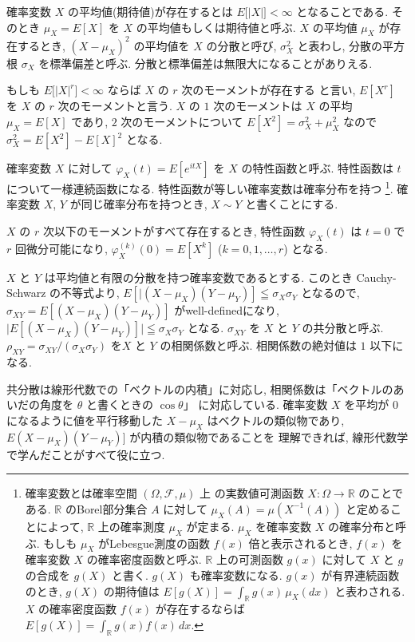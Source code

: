\documentclass[12pt,twoside]{jarticle}
\newcommand\R{{\mathbb R}} %
\theoremstyle{jplain}
\theoremstyle{jplain}
\theoremstyle{jplain}
\numberwithin{theorem}{section}
\numberwithin{equation}{section}
\numberwithin{figure}{section}
\numberwithin{table}{section}
\begin{document}
確率変数 $X$ の平均値(期待値)が存在するとは $E\bigl[|X|\bigr]<\infty$ となることである. 
そのとき $\mu_X=E[X]$ を $X$ の平均値もしくは期待値と呼ぶ.
$X$ の平均値 $\mu_X$ が存在するとき,  
$(X-\mu_X)^2$ の平均値を $X$ の分散と呼び, 
$\sigma_X^2$ と表わし, 分散の平方根 $\sigma_X$ を標準偏差と呼ぶ.
分散と標準偏差は無限大になることがありえる.

もしも $E\bigl[|X|^r\bigr]<\infty$ ならば $X$ の $r$ 次のモーメントが存在する
と言い, $E[X^r]$ を $X$ の $r$ 次のモーメントと言う.
$X$ の $1$ 次のモーメントは $X$ の平均 $\mu_X=E[X]$ であり, 
$2$ 次のモーメントについて $E[X^2]=\sigma_X^2+\mu_X^2$ 
なので $\sigma_X^2=E[X^2]-E[X]^2$ となる.

確率変数 $X$ に対して $\varphi_X(t)=E[e^{itX}]$ を $X$ の特性函数と呼ぶ.
特性函数は $t$ について一様連続函数になる.
特性函数が等しい確率変数は確率分布を持つ%
\footnote{確率変数とは確率空間 $(\Omega,\mathcal{F},\mu)$ 上
の実数値可測函数 $X:\Omega\to\R$ のことである. 
$\R$ のBorel部分集合 $A$ に対して $\mu_X(A)=\mu(X^{-1}(A))$ と定めることによって, 
$\R$ 上の確率測度 $\mu_X$ が定まる. $\mu_X$ を確率変数 $X$ の確率分布と呼ぶ.
もしも $\mu_X$ がLebesgue測度の函数 $f(x)$ 倍と表示されるとき, 
$f(x)$ を確率変数 $X$ の確率密度函数と呼ぶ.
$\R$ 上の可測函数 $g(x)$ に対して $X$ と $g$ の合成を $g(X)$ と書く.
$g(X)$ も確率変数になる. 
$g(x)$ が有界連続函数のとき, 
$g(X)$ の期待値は $E[g(X)]=\int_\R g(x)\,\mu_X(dx)$ と表わされる. 
$X$ の確率密度函数 $f(x)$ が存在するならば $E[g(X)]=\int_\R g(x)f(x)\,dx$.
}.
確率変数 $X$, $Y$ が同じ確率分布を持つとき, $X\sim Y$ と書くことにする.

$X$ の $r$ 次以下のモーメントがすべて存在するとき, 
特性函数 $\varphi_X(t)$ は $t=0$ で $r$ 回微分可能になり, 
$\varphi_X^{(k)}(0)=E[X^k]$ ($k=0,1,\ldots,r$) となる.

$X$ と $Y$ は平均値と有限の分散を持つ確率変数であるとする.
このとき Cauchy-Schwarz の不等式より, 
$E[|(X-\mu_X)(Y-\mu_Y)]\leqq\sigma_X\sigma_Y$ となるので, 
$\sigma_{XY}=E[(X-\mu_X)(Y-\mu_Y)]$ がwell-definedになり, 
$\bigl|E[(X-\mu_X)(Y-\mu_Y)]\bigr|\leqq\sigma_X\sigma_Y$ となる.
$\sigma_{XY}$ を $X$ と $Y$ の共分散と呼ぶ.
$\rho_{XY}=\sigma_{XY}/(\sigma_X\sigma_Y)$ を$X$ と $Y$ の相関係数と呼ぶ.
相関係数の絶対値は $1$ 以下になる.

共分散は線形代数での「ベクトルの内積」に対応し, 
相関係数は「ベクトルのあいだの角度を $\theta$ と書くときの $\cos\theta$」
に対応している.
確率変数 $X$ を平均が $0$ になるように値を平行移動した $X-\mu_X$
はベクトルの類似物であり, $E(X-\mu_X)(Y-\mu_Y)]$ が内積の類似物であることを
理解できれば, 線形代数学で学んだことがすべて役に立つ.
\end{document}
